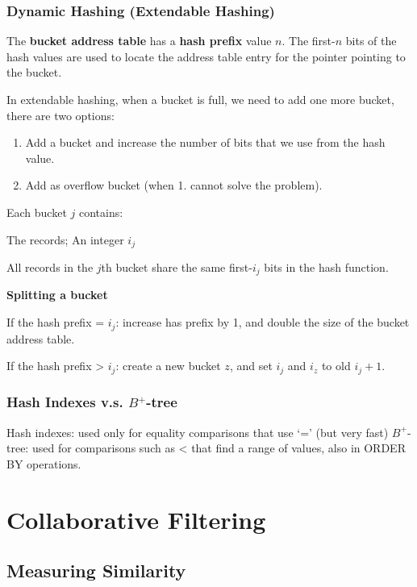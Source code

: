\documentclass[11pt,a4paper]{article}
\begin{document}
\subsubsection{Dynamic Hashing (Extendable Hashing)}
The \textbf{bucket address table} has a \textbf{hash prefix} value $n$.
The first-$n$ bits of the hash values are used to locate the address table entry for the pointer pointing to the bucket.

In extendable hashing, when a bucket is full, we need to add one more bucket, there are two options: \par

\begin{enumerate}
    \item [1. ] Add a bucket and increase the number of bits that we use from the hash value.

    \item [2. ] Add as overflow bucket (when 1. cannot solve the problem).

\end{enumerate}

Each bucket $j$ contains: \par
\quad The records; An integer $i_j$ \par
All records in the $j$th bucket share the same first-$i_j$ bits in the hash function. \par

\textbf{Splitting a bucket} \par
If the hash prefix = $i_j$: increase has prefix by 1, and double the size of the bucket address table. \par
If the hash prefix > $i_j$: create a new bucket $z$, and set $i_j$ and $i_z$ to old $i_j + 1$. 

\subsubsection{\texorpdfstring{Hash Indexes v.s. $B^+$-tree}{Hash Indexes v.s. B+-tree}}
Hash indexes: used only for equality comparisons that use `=' (but very fast)
$B^+$-tree: used for comparisons such as < that find a range of values, also in ORDER BY operations.

\section{Collaborative Filtering}
\subsection{Measuring Similarity}
\end{document}
